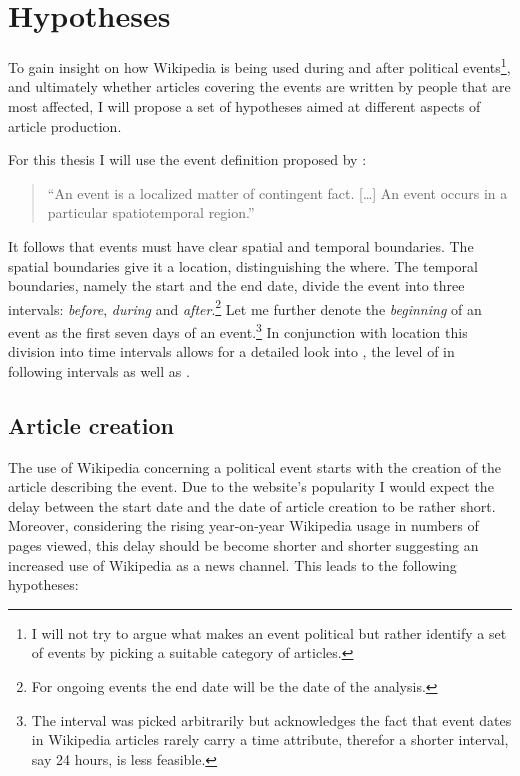 \chapter{Hypotheses}\label{ch:hypotheses}

To gain insight on how Wikipedia is being used during and after political events\footnote{I will not try to argue what makes an event political but rather identify a set of events by picking a suitable category of articles.}, and ultimately whether articles covering the events are written by people that are most affected, I will propose a set of hypotheses aimed at different aspects of article production.

For this thesis I will use the event definition proposed by \textcite[243]{lewis1987philosophical}: 
\begin{quotation}
``An event is a localized matter of contingent fact. [\ldots] An event occurs in a particular spatiotemporal region.''
\end{quotation}
It follows that events must have clear spatial and temporal boundaries.
The spatial boundaries give it a location, distinguishing the where.
The temporal boundaries, namely the start and the end date, divide the event into three intervals: \emph{before}, \emph{during} and \emph{after}.\footnote{For ongoing events the end date will be the date of the analysis.}
Let me further denote the \emph{beginning} of an event as the first seven days of an event.\footnote{The interval was picked arbitrarily but acknowledges the fact that event dates in Wikipedia articles rarely carry a time attribute, therefor a shorter interval, say 24 hours, is less feasible.}
In conjunction with location this division into time intervals allows for a detailed look into , the level of  in following intervals as well as  .

\section{Article creation}\label{sec:articlecreation}

The use of Wikipedia concerning a political event starts with the creation of the article describing the event.
Due to the website's popularity I would expect the delay between the start date and the date of article creation to be rather short.
Moreover, considering the rising year-on-year Wikipedia usage in numbers of pages viewed\cite{wikipv}, this delay should be become shorter and shorter suggesting an increased use of Wikipedia as a news channel.
This leads to the following hypotheses:

